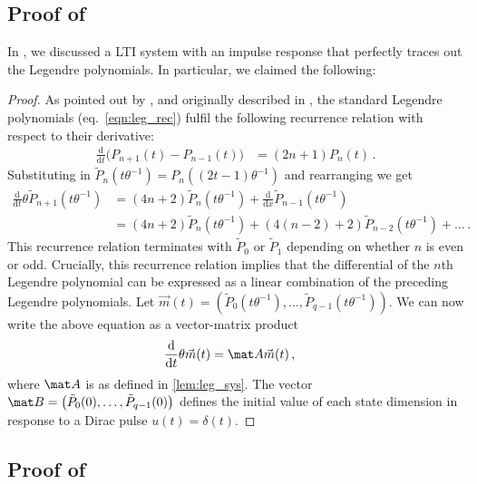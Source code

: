 \subsection{Proof of }
\label{app:leg_sys_proof}

In , we discussed a LTI system with an impulse response that perfectly traces out the Legendre polynomials.
In particular, we claimed the following:

\LemLegSys*

\begin{proof}
As pointed out by \citet[Appendix B.1.1]{gu2020hippo}, and originally described in \citet[Chapter 12.2, p.~751]{arfken2005mathematical}, the standard Legendre polynomials (eq.~\ref{eqn:leg_rec}) fulfil the following recurrence relation with respect to their derivative:
\begin{align*}
	\frac{\mathrm{d}}{\mathrm{d}t} \big( P_{n + 1}(t) - P_{n - 1}(t) \big) &= (2n + 1) P_n(t) \,.
\end{align*}
Substituting in $\tilde P_n(t \theta^{-1}) = P_n((2t - 1) \theta^{-1})$ and rearranging we get
\begin{align*}
	\frac{\mathrm{d}}{\mathrm{d}t} \theta \tilde P_{n + 1}(t \theta^{-1})
		&= (4n + 2) \tilde P_n(t \theta^{-1}) + \frac{\mathrm{d}}{\mathrm{d}x} \tilde P_{n - 1}(t \theta^{-1}) \\
		&= (4n + 2) \tilde P_n(t \theta^{-1}) + (4(n - 2) + 2) \tilde P_{n - 2}(t \theta^{-1}) + \ldots \,.
\end{align*}
This recurrence relation terminates with $\tilde P_0$ or $\tilde P_1$ depending on whether $n$ is even or odd.
Crucially, this recurrence relation implies that the differential of the $n$th Legendre polynomial can be expressed as a linear combination of the preceding Legendre polynomials.
Let $\vec m(t) = (\tilde P_0(t \theta^{-1}), \ldots, \tilde P_{q - 1}(t \theta^{-1}))$. We can now write the above equation as a vector-matrix product
\begin{align*}
	\frac{\mathrm{d}}{\mathrm{d}t} \theta \vec m(t) &= {\mat A} \vec m(t) \,,
\end{align*}
where ${\mat A}$ is as defined in \cref{lem:leg_sys}.
The vector ${\mat B} = \big( \tilde P_0(0), \ldots, \tilde P_{q - 1}(0)\big)$ defines the initial value of each state dimension in response to a Dirac pulse $u(t) = \delta(t)$. \qedhere
\end{proof}

\subsection{Proof of }

